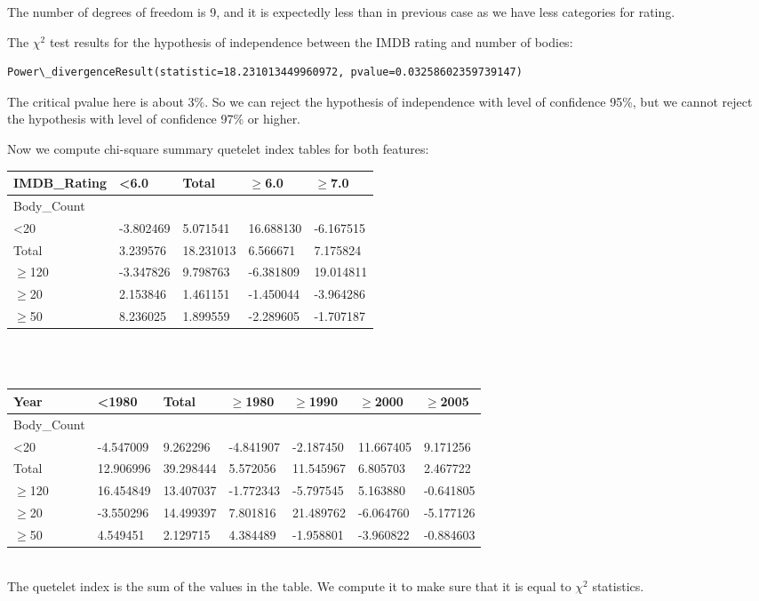 \documentclass[a4paper,14pt]{article}
\renewcommand{\geq}{\ensuremath{\geqslant}}
\begin{document}
The number of degrees of freedom is 9, and it is expectedly less than in previous case as we have less categories for rating. 

The $\chi^2$ test results for the hypothesis of independence between the IMDB rating and number of bodies:

\footnotesize \begin{Verbatim}[commandchars=\\\{\}]
 Power\_divergenceResult(statistic=18.231013449960972, pvalue=0.03258602359739147)
\end{Verbatim} 
\normalsize

  The critical pvalue here is about 3\%. So we can reject the hypothesis of
independence with level of confidence 95\%, but we cannot reject the
hypothesis with level of confidence 97\% or higher.


Now we compute chi-square summary quetelet index tables for both features:
\\

\footnotesize \begin{tabular}{lllll} \hline
	IMDB\_Rating  & \textless{}6.0 & Total     & $\geq$6.0      & $\geq$7.0      \\ \hline
	Body\_Count   &                &           &           &           \\
	\textless{}20 & -3.802469      & 5.071541  & 16.688130 & -6.167515 \\
	Total         & 3.239576       & 18.231013 & 6.566671  & 7.175824  \\
	$\geq$120          & -3.347826      & 9.798763  & -6.381809 & 19.014811 \\
	$\geq$20           & 2.153846       & 1.461151  & -1.450044 & -3.964286 \\
	$\geq$50           & 8.236025       & 1.899559  & -2.289605 & -1.707187 
\end{tabular} 
\normalsize
\\
\

\footnotesize \begin{tabular}{lllllll} \hline
	Year          & \textless{}1980 & Total     & $\geq$1980     & $\geq$1990     & $\geq$2000     & $\geq$2005     \\ \hline
	Body\_Count   &                 &           &           &           &           &           \\
	\textless{}20 & -4.547009       & 9.262296  & -4.841907 & -2.187450 & 11.667405 & 9.171256  \\
	Total         & 12.906996       & 39.298444 & 5.572056  & 11.545967 & 6.805703  & 2.467722  \\
	$\geq$120          & 16.454849       & 13.407037 & -1.772343 & -5.797545 & 5.163880  & -0.641805 \\
	$\geq$20           & -3.550296       & 14.499397 & 7.801816  & 21.489762 & -6.064760 & -5.177126 \\
	$\geq$50           & 4.549451        & 2.129715  & 4.384489  & -1.958801 & -3.960822 & -0.884603 
\end{tabular} 
\normalsize
\\
The quetelet index is the sum of the values in the table. We compute it to make sure that it is equal to $\chi^2$ statistics. 
\end{document}
